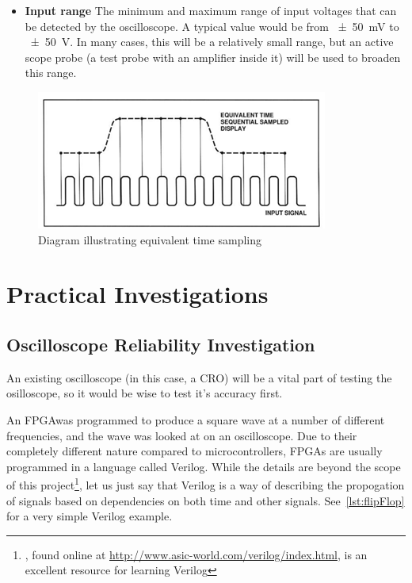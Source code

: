 \begin{itemize}
  \item \textbf{Input range} The minimum and maximum range of input voltages
    that can be detected by the oscilloscope. A typical value would be from
    \SI{\pm 50}{\mV} to \SI{\pm 50}{\V}. In many cases, this will be a
    relatively small range, but an active scope probe (a test probe with an
    amplifier inside it) will be used to broaden this range.

\end{itemize}

\begin{figure}
  \centering
  \includegraphics{img/equivalent_time_sampling.png}
  \caption[Equivalent Time Sampling Diagram]{Diagram illustrating equivalent time sampling ~\autocite{EquivalentTimeSampling}}
  \label{fig:EquivalentTimeSampling}
\end{figure}

\section{Practical Investigations}

\subsection{Oscilloscope Reliability Investigation}

An existing oscilloscope (in this case, a CRO) will be a vital part of testing
the osilloscope, so it would be wise to test it's accuracy first.

An FPGA\fdeffpga was programmed to produce a square wave at a number of
different frequencies, and the wave was looked at on an oscilloscope. Due to
their completely different nature compared to microcontrollers, FPGAs are
usually programmed in a language called Verilog. While the details are beyond
the scope of this project\footnote{\textcite{VerilogTutorial}, found online at
\url{http://www.asic-world.com/verilog/index.html}, is an excellent resource for
learning Verilog}, let us just say that Verilog is a way of describing the
propogation of signals based on dependencies on both time and other
signals\autocite{VerilogWiki}. See~\cref{lst:flipFlop} for a very simple Verilog
example.

